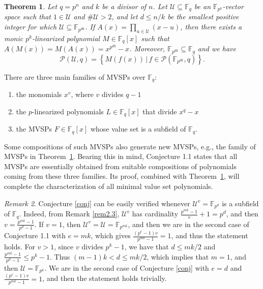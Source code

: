 \documentclass[11pt]{amsart}
\newcommand{\F}{\mathbb{F}}
\newcommand{\pp}{\mathcal P}
\newtheorem{theorem}{Theorem}[section]
\theoremstyle{definition}
\theoremstyle{remark}
\newtheorem{remark}[theorem]{Remark}
\begin{document}
\begin{theorem}\label{thm:main2}
Let $q=p^n$ and $k$ be a divisor of $n$. Let  $\mathcal U\subseteq \F_q$ be an $\F_{p^k}$-vector space such that  $1 \in \mathcal U$ and $\# \mathcal U>2$, and  let $d\leq n/k$ be  the smallest positive  integer for which  $ \mathcal U\subseteq \F_{p^{dk}}$. If $A(x)=\prod_{u\in \mathcal U}(x- u)$, then there exists a monic $p^k$-linearized polynomial $M\in \F_q[x]$ such that $A(M(x))=M(A(x))=x^{p^{dk}}-x$. Moreover, $\F_{p^{dk}}\subseteq \F_q$ and we have
$$\mathcal P(\mathcal U, q)=\left\{ M(f(x))\,|\, f\in \pp(\F_{p^{dk}}, q)\right\}.$$
\end{theorem}
There are three main families of MVSPs over $\F_q$: 
\begin{enumerate}[\rm(i)]
\item the monomials $x^v$, where $v$ divides  $q-1$
\item  the  $p$-linearized polynomials $L\in \F_q[x]$ that divide $x^q-x$
\item the MVSPs $F\in \F_q[x]$ whose value set is a subfield of $\F_q$.
\end{enumerate}
Some compositions of such MVSPs also generate new MVSPs, e.g., the family of MVSPs in Theorem~\ref{thm:main2}. Bearing this in mind,  Conjecture 1.1 states  that all MVSPs are essentially obtained from suitable compositions of polynomials coming from these three families. Its  proof, combined with Theorem~\ref{thm:main2}, will complete the characterization of all minimal value set polynomials.






\begin{remark}\label{rem} Conjecture \ref{conj} can be easily verified whenever  $\mathcal U^v=\F_{p^d}$ is a subfield of $\mathbb{F}_q$. Indeed, from Remark \ref{rem2.3},  $\mathcal U^v$ has cardinality $\frac{p^{mk}-1}{v}+1=p^d$, and then  $v=\frac{p^{m k}-1}{p^d-1}$. If $v=1$,  then $\mathcal{U}^v=\mathcal{U}=\mathbb{F}_{p^{m k}}$, and then we are in the second case of Conjecture 1.1 with $e=m k$, which gives $\frac{\left(p^e-1\right) v}{p^{m k}-1}=1$, and thus the statement holds. For $v>1$, since $v$ divides $p^k-1$, we have that $d \leq m k / 2$ and $\frac{p^{m k}-1}{p^d-1} \leq p^k-1$. Thus $(m-1) k<d \leq m k / 2$, which implies that $m=1$, and then $\mathcal{U}=\mathbb{F}_{p^k}$. We are in the second case of Conjecture \ref{conj} with $e=d$ and $\frac{\left(p^e-1\right) v}{p^{m k}-1}=1$, and then the statement holds trivially.
\end{remark}
\end{document}
